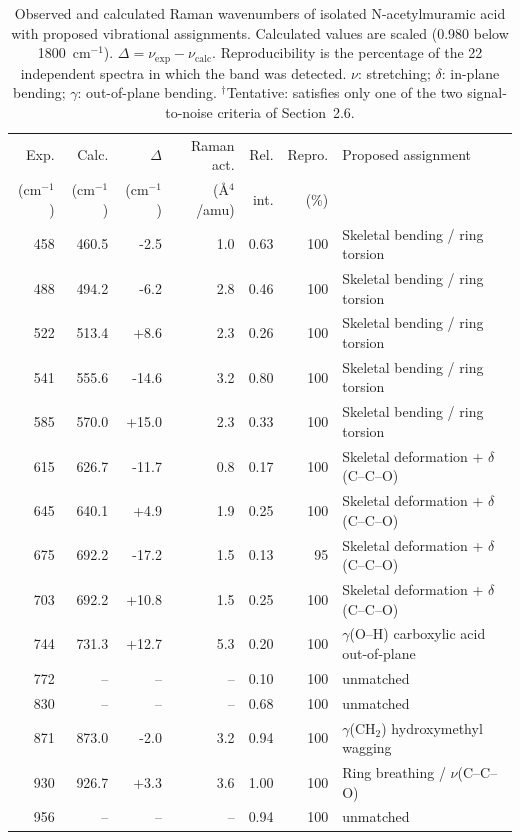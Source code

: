\documentclass[preprint,12pt]{elsarticle}
\newcommand{\wn}{\ensuremath{\mathrm{cm}^{-1}}}
\begin{document}
\begin{table}[htbp]
\centering
\caption{Observed and calculated Raman wavenumbers of isolated N-acetylmuramic
acid with proposed vibrational assignments. Calculated values are scaled (0.980
below 1800~\wn{}). $\Delta = \nu_{\mathrm{exp}} - \nu_{\mathrm{calc}}$.
Reproducibility is the percentage of the 22 independent spectra in which the
band was detected. $\nu$: stretching; $\delta$: in-plane bending; $\gamma$:
out-of-plane bending. $^{\dagger}$Tentative: satisfies only one of the two
signal-to-noise criteria of Section~2.6.}
\label{tab:comparison}
\small
\begin{tabular}{rrrrrrp{4.4cm}}
\toprule
Exp. & Calc. & $\Delta$ & Raman act. & Rel. & Repro. & Proposed assignment \\
(\wn{}) & (\wn{}) & (\wn{}) & (\AA$^4$/amu) & int. & (\%) & \\
\midrule
458 & 460.5 & -2.5 & 1.0 & 0.63 & 100 & Skeletal bending / ring torsion \\
488 & 494.2 & -6.2 & 2.8 & 0.46 & 100 & Skeletal bending / ring torsion \\
522 & 513.4 & +8.6 & 2.3 & 0.26 & 100 & Skeletal bending / ring torsion \\
541 & 555.6 & -14.6 & 3.2 & 0.80 & 100 & Skeletal bending / ring torsion \\
585 & 570.0 & +15.0 & 2.3 & 0.33 & 100 & Skeletal bending / ring torsion \\
615 & 626.7 & -11.7 & 0.8 & 0.17 & 100 & Skeletal deformation + $\delta$(C--C--O) \\
645 & 640.1 & +4.9 & 1.9 & 0.25 & 100 & Skeletal deformation + $\delta$(C--C--O) \\
675 & 692.2 & -17.2 & 1.5 & 0.13 & 95 & Skeletal deformation + $\delta$(C--C--O) \\
703 & 692.2 & +10.8 & 1.5 & 0.25 & 100 & Skeletal deformation + $\delta$(C--C--O) \\
744 & 731.3 & +12.7 & 5.3 & 0.20 & 100 & $\gamma$(O--H) carboxylic acid out-of-plane \\
772 & -- & -- & -- & 0.10 & 100 & unmatched \\
830 & -- & -- & -- & 0.68 & 100 & unmatched \\
871 & 873.0 & -2.0 & 3.2 & 0.94 & 100 & $\gamma$(CH$_2$) hydroxymethyl wagging \\
930 & 926.7 & +3.3 & 3.6 & 1.00 & 100 & Ring breathing / $\nu$(C--C--O) \\
956 & -- & -- & -- & 0.94 & 100 & unmatched \\

\end{tabular}
\end{table}
\end{document}
